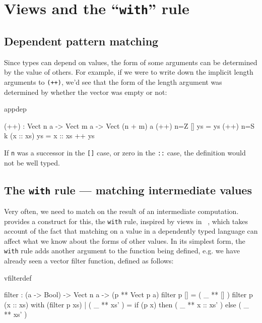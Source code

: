 \section{Views and the ``\texttt{with}'' rule}

\subsection{Dependent pattern matching}

Since types can depend on values, the form of some arguments can be determined
by the value of others. For example, if we were to write down the implicit
length arguments to \texttt{(++)}, we'd see that the form of the length argument was
determined by whether the vector was empty or not:

\begin{SaveVerbatim}{appdep}

(++) : Vect n a -> Vect m a -> Vect (n + m) a
(++) {n=Z}   []        ys = ys
(++) {n=S k} (x :: xs) ys = x :: xs ++ ys

\end{SaveVerbatim}

\noindent
If \texttt{n} was a successor in the \texttt{[]} case, or zero in the 
\texttt{::} case, the definition
would not be well typed.

\subsection{The \texttt{with} rule --- matching intermediate values}

Very often, we need to match on the result of an intermediate computation.
\Idris{} provides a construct for this, the \texttt{with} rule, 
inspired by views in \Epigram~\cite{view-left},
which takes account of the
fact that matching on a value in a dependently typed language can affect what
we know about the forms of other values. In its simplest form, the \texttt{with} rule
adds another argument to the function being defined, e.g. we have already seen
a vector filter function, defined as follows:

\begin{SaveVerbatim}{vfilterdef}

filter : (a -> Bool) -> Vect n a -> (p ** Vect p a)
filter p [] = ( _ ** [] )
filter p (x :: xs) with (filter p xs)
  | ( _ ** xs' ) = if (p x) then ( _ ** x :: xs' ) else ( _ ** xs' )

\end{SaveVerbatim}

